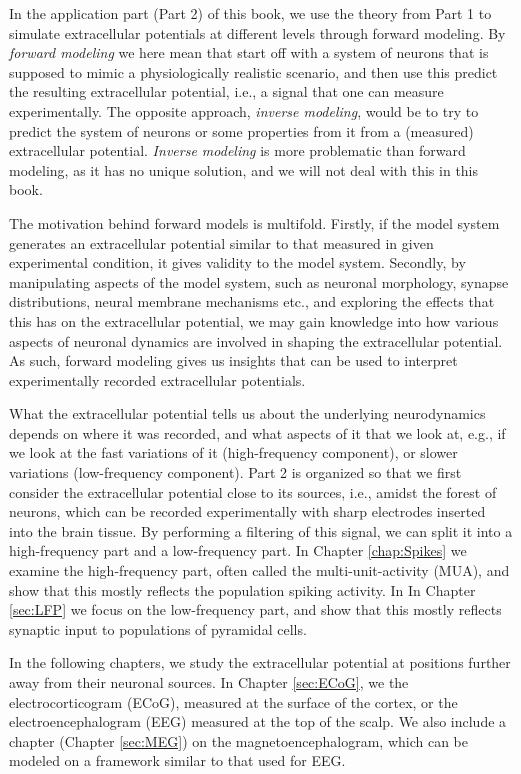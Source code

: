 In the application part (Part 2) of this book, we use the theory from Part 1 to simulate extracellular potentials at different levels through forward modeling. By \textit{forward modeling} we here mean that start off with a system of neurons that is supposed to mimic a physiologically realistic scenario, and then use this predict the resulting extracellular potential, i.e., a signal that one can measure experimentally. The opposite approach, \textit{inverse modeling}, would be to try to predict the system of neurons or some properties from it from a (measured) extracellular potential. \textit{Inverse modeling} is more problematic than forward modeling, as it has no unique solution, and we will not deal with this in this book.

The motivation behind forward models is multifold. Firstly, if the model system generates an extracellular potential similar to that measured in given experimental condition, it gives validity to the model system. Secondly, by manipulating aspects of the model system, such as neuronal morphology, synapse distributions, neural membrane mechanisms etc., and exploring the effects that this has on the extracellular potential, we may gain knowledge into how various aspects of neuronal dynamics are involved in shaping the extracellular potential. As such, forward modeling gives us insights that can be used to interpret experimentally recorded extracellular potentials.

What the extracellular potential tells us about the underlying neurodynamics depends on where it was recorded, and what aspects of it that we look at, e.g., if we look at the fast variations of it (high-frequency component), or slower variations (low-frequency component). Part 2 is organized so that we first consider the extracellular potential close to its sources, i.e., amidst the forest of neurons, which can be recorded experimentally with sharp electrodes inserted into the brain tissue. By performing a filtering of this signal, we can split it into a high-frequency part and a low-frequency part. In Chapter \ref{chap:Spikes} we examine the high-frequency part, often called the multi-unit-activity (MUA), and show that this mostly reflects the population spiking activity. In In Chapter \ref{sec:LFP} we focus on the low-frequency part, and show that this mostly reflects synaptic input to populations of pyramidal cells.

In the following chapters, we study the extracellular potential at positions further away from their neuronal sources. In Chapter \ref{sec:ECoG}, we the electrocorticogram (ECoG), measured at the surface of the cortex, or the electroencephalogram (EEG) measured at the top of the scalp. We also include a chapter (Chapter \ref{sec:MEG}) on the magnetoencephalogram, which can be modeled on a framework similar to that used for EEG.


